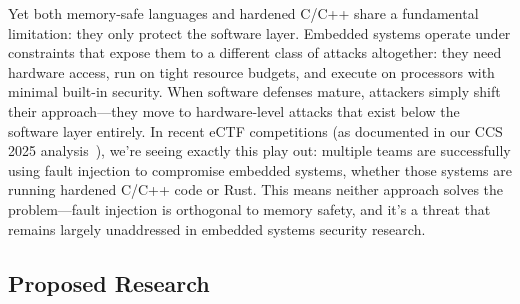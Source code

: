 Yet both memory-safe languages and hardened C/C++ share a fundamental limitation: they only protect the software layer.
Embedded systems operate under constraints that expose them to a different class of attacks altogether: they need hardware access, run on tight resource budgets, and execute on processors with minimal built-in security.
When software defenses mature, attackers simply shift their approach—they move to hardware-level attacks that exist below the software layer entirely.
In recent eCTF competitions (as documented in our CCS 2025 analysis~\cite{ma2025ectf}), we're seeing exactly this play out: multiple teams are successfully using fault injection to compromise embedded systems, whether those systems are running hardened C/C++ code or Rust.
This means neither approach solves the problem—fault injection is orthogonal to memory safety, and it's a threat that remains largely unaddressed in embedded systems security research.

\subsection{Proposed Research}

